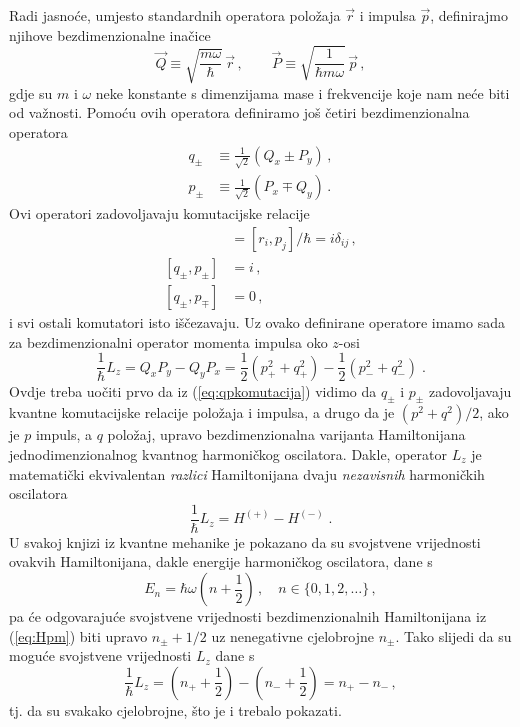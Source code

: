 Radi jasnoće, umjesto standardnih operatora položaja $\vec{r}$
i impulsa $\vec{p}$, definirajmo njihove bezdimenzionalne inačice
\begin{equation}
    \vec{Q} \equiv \sqrt{\frac{m \omega}{\hbar}} \,\vec{r} \,, \qquad
    \vec{P} \equiv \sqrt{\frac{1}{\hbar m \omega}} \, \vec{p} \,,
\end{equation}
gdje su $m$ i $\omega$ neke konstante s dimenzijama mase i frekvencije
koje nam neće biti od važnosti. Pomoću ovih operatora definiramo 
još četiri bezdimenzionalna operatora
\begin{align}
    q_{\pm}& \equiv \frac{1}{\sqrt{2}} (Q_x \pm P_y) \,, \\
    p_{\pm}& \equiv \frac{1}{\sqrt{2}} (P_x \mp Q_y) \,.
\end{align}
Ovi operatori zadovoljavaju komutacijske relacije
\begin{align}
    [Q_i, P_j]& =  [r_i, p_j] / \hbar = i \delta_{ij} \,, \\
    [q_{\pm}, p_{\pm}]& = i \,, \label{eq:qpkomutacija}\\
    [q_{\pm}, p_{\mp}]& = 0 \,,
\end{align}
i svi ostali komutatori isto iščezavaju. Uz ovako definirane
operatore imamo sada za bezdimenzionalni operator momenta impulsa
oko $z$-osi
\begin{equation}
    \frac{1}{\hbar} L_z = Q_x P_y - Q_y P_x = \frac{1}{2}(p_{+}^2 + q_{+}^2)
                   - \frac{1}{2}(p_{-}^2 + q_{-}^2) \;.
\end{equation}
Ovdje treba uočiti prvo da iz (\ref{eq:qpkomutacija}) vidimo da
$q_{\pm}$ i $p_{\pm}$ zadovoljavaju kvantne komutacijske relacije položaja
i impulsa, a drugo da je $(p^2 + q^2)/2$, ako je $p$ impuls, a $q$ položaj,
upravo bezdimenzionalna varijanta Hamiltonijana jednodimenzionalnog kvantnog
harmoničkog oscilatora. Dakle, operator $L_z$ je matematički ekvivalentan
\emph{razlici} Hamiltonijana dvaju \emph{nezavisnih} harmoničkih oscilatora
\begin{equation}
\frac{1}{\hbar} L_z = H^{(+)} - H^{(-)} \;.
\label{eq:Hpm}
\end{equation}
U svakoj knjizi iz kvantne mehanike je pokazano
da su svojstvene vrijednosti ovakvih Hamiltonijana, dakle energije harmoničkog
oscilatora, dane s 
\begin{equation}
    E_n = \hbar \omega \left(n + \frac{1}{2}\right)\,, 
    \quad n \in \{0, 1, 2, \ldots\} \,,
\end{equation}
pa će odgovarajuće svojstvene vrijednosti bezdimenzionalnih Hamiltonijana
iz (\ref{eq:Hpm}) biti upravo $n_{\pm} + 1/2$ uz nenegativne
cjelobrojne $n_{\pm}$. Tako slijedi da su moguće svojstvene vrijednosti
$L_z$ dane s
\begin{equation}
    \frac{1}{\hbar} L_z = \left(n_{+} + \frac{1}{2}\right) -
    \left(n_{-} + \frac{1}{2}\right) = n_{+} - n_{-} \,,
\end{equation}
tj. da su svakako cjelobrojne, što je i trebalo pokazati.

